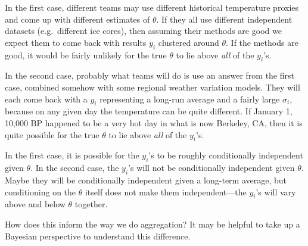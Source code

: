 \documentclass[12pt]{article}
\begin{document}
In the first case, different teams may use different historical temperature proxies and come up with different estimates of $\theta$. If they all use different independent datasets (e.g.~different ice cores), then assuming their methods are good we expect them to come back with results $y_i$ clustered around $\theta$. If the methods are good, it would be fairly unlikely for the true $\theta$ to lie above \emph{all} of the $y_i$'s.

In the second case, probably what teams will do is use an answer from the first case, combined somehow with some regional weather variation models. They will each come back with a $y_i$ representing a long-run average and a fairly large $\sigma_i$, because on any given day the temperature can be quite different. If January 1, 10,000 BP happened to be a very hot day in what is now Berkeley, CA, then it is quite possible for the true $\theta$ to lie above \emph{all} of the $y_i$'s.

In the first case, it is possible for the $y_i$'s to be roughly conditionally independent given $\theta$. In the second case, the $y_i$'s will not be conditionally independent given $\theta$. Maybe they will be conditionally independent given a long-term average, but conditioning on the $\theta$ itself does not make them independent---the $y_i$'s will vary above and below $\theta$ together.

How does this inform the way we do aggregation? It may be helpful to take up a Bayesian perspective to understand this difference.
\end{document}
